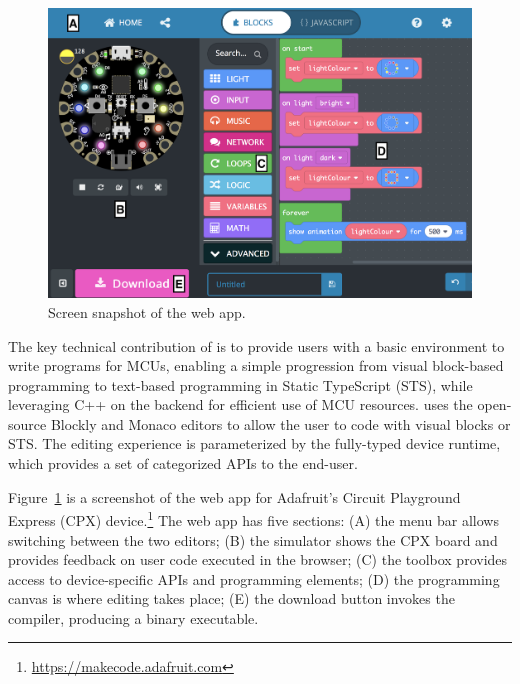 \section{\MC}
\label{sec:makecode}

\begin{figure}[t]
    \includegraphics[width=\columnwidth]{images/makecode-cplay-annotated}
\caption{\label{fig:screenSnap}Screen snapshot of the \MC web app.}
\end{figure}

The key technical contribution of \MC is to provide users with a basic environment to write programs for MCUs, enabling a simple progression from visual block-based programming to text-based programming in Static TypeScript (STS), while leveraging C++ on the backend for efficient use of MCU resources.
\MC uses the open-source Blockly and Monaco editors to allow the user to code with visual blocks or STS. The editing experience is parameterized by the fully-typed device runtime,
which provides a set of categorized APIs to the end-user.


Figure~\ref{fig:screenSnap} is a screenshot of the \MC web app for Adafruit's Circuit Playground Express (CPX) device.\footnote{\url{https://makecode.adafruit.com}} The web app has five sections: (A) the menu bar allows switching between the two editors; (B) the simulator shows the CPX board and provides feedback on user code executed in the browser; (C) the toolbox provides access to device-specific APIs and programming elements; (D) the programming canvas is where
editing takes place; (E) the download button invokes the compiler, producing a binary executable.

